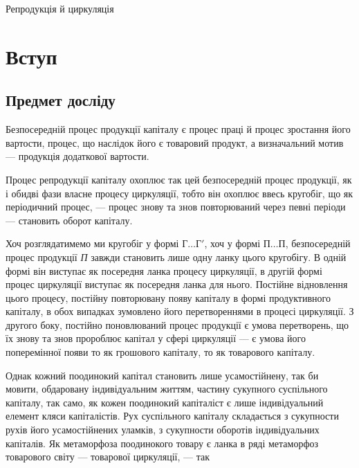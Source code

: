 


%
  {\protect\partnumberline{\thepart}Репродукція й циркуляція}%
%
  {\protect{}}%


\section[Вступ]{Вступ\footnotemark{}}

\subsection{Предмет досліду}

\label{original-267}
Безпосередній процес продукції капіталу є процес праці й процес
зростання його вартости, процес, що наслідок його є товаровий продукт,
а визначальний мотив — продукція додаткової вартости.

Процес репродукції капіталу охоплює так цей безпосередній процес
продукції, як і обидві фази власне процесу циркуляції, тобто він охоплює
ввесь кругобіг, що як періодичний процес, — процес знову та знов
повторюваний через певні періоди — становить оборот капіталу.

Хоч розглядатимемо ми кругобіг у формі $Г\dots{} Г'$, хоч у формі $П\dots{} П$,
безпосередній процес продукції \emph{П} завжди становить лише одну ланку
цього кругобігу. В одній формі він виступає як посередня ланка процесу
циркуляції, в другій формі процес циркуляції виступає як посередня
ланка для нього. Постійне відновлення цього процесу, постійну повторювану
появу капіталу в формі продуктивного капіталу, в обох випадках
зумовлено його перетвореннями в процесі циркуляції. З другого боку,
постійно поновлюваний процес продукції є умова перетворень, що їх
знову та знов пророблює капітал у сфері циркуляції — є умова його
поперемінної появи то як грошового капіталу, то як товарового
капіталу.

Однак кожний поодинокий капітал становить лише усамостійнену, так
би мовити, обдаровану індивідуальним життям, частину сукупного суспільного
капіталу, так само, як кожен поодинокий капіталіст є лише індивідуальний
елемент кляси капіталістів. Рух суспільного капіталу складається
з сукупности рухів його усамостійнених уламків, з сукупности оборотів
індивідуальних капіталів. Як метаморфоза поодинокого товару є ланка
в ряді метаморфоз товарового світу — товарової циркуляції, — так
\parbreak{}  %
